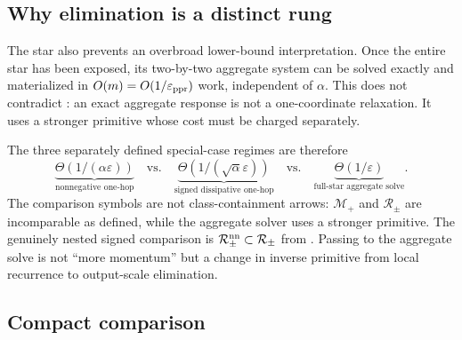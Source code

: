 \subsection{Why elimination is a distinct rung}

The star also prevents an overbroad lower-bound interpretation.  Once the
entire star has been exposed, its two-by-two aggregate system can be solved
exactly and materialized in $O(m)=O(1/\varepsilon_{\rm ppr})$ work,
independent of $\alpha$.  This does not contradict
: an exact aggregate response is not a
one-coordinate relaxation.  It uses a stronger primitive whose cost must be
charged separately.

The three separately defined special-case regimes are therefore
\begin{equation}
  \underbrace{\Theta(1/(\alpha\varepsilon))}_{
      \text{nonnegative one-hop}}
  \quad\text{vs.}\quad
  \underbrace{\Theta(1/(\sqrt\alpha\varepsilon))}_{
      \text{signed dissipative one-hop}}
  \quad\text{vs.}\quad
  \underbrace{\Theta(1/\varepsilon)}_{
      \text{full-star aggregate solve}}.
  \label{eq:signed-star-three-rungs}
\end{equation}
The comparison symbols are not class-containment arrows:
$\mathcal M_+$ and $\mathcal R_\pm$ are incomparable as defined, while the
aggregate solver uses a stronger primitive.  The genuinely nested signed
comparison is $\mathcal R_\pm^{\rm nn}\subset\mathcal R_\pm$ from
.  Passing to the aggregate solve is
not ``more momentum'' but a change in inverse primitive from local recurrence
to output-scale elimination.

\subsection{Compact comparison}

